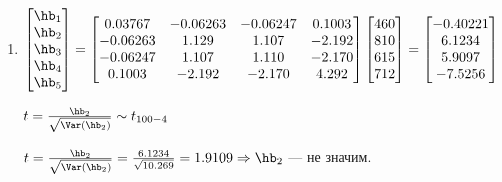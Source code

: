 \documentclass[pdftex,11pt,openany]{book}\usepackage[]{graphicx}\usepackage[]{color}
\begin{document}
\begin{solution}
\begin{enumerate}
\item $\begin{bmatrix}
\hb_1 \\
\hb_2 \\
\hb_3 \\
\hb_4 \\
\hb_5 \\
\end{bmatrix} = \begin{bmatrix}
0.03767 & -0.06263 & -0.06247 & 0.1003 \\
-0.06263 & 1.129 & 1.107 & -2.192 \\
-0.06247 & 1.107 & 1.110 & -2.170 \\
0.1003 & -2.192 & -2.170 & 4.292 \\
\end{bmatrix} \begin{bmatrix}
460\\
810\\
615\\
712\\
\end{bmatrix} = \begin{bmatrix}
-0.40221 \\
6.1234 \\
5.9097 \\
-7.5256 \\
\end{bmatrix}$

$t = \frac{\hb_2}{\sqrt{\Var(\hb_2)}} \sim t_{100-4}$

$t = \frac{\hb_2}{\sqrt{\Var(\hb_2)}} = \frac{6.1234}{\sqrt{10.269}} = 1.9109 \Rightarrow \hb_2$ --- не значим.
\end{enumerate}
\end{solution}
\end{document}
